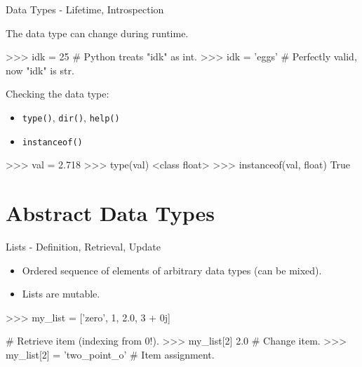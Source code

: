 \documentclass[10pt]{beamer}
\begin{document}
\begin{frame}[fragile]{Data Types - Lifetime, Introspection}
	
	\pause
	The data type can change during runtime.
	
	\pause	
	\begin{pythoncode}
		>>>  idk = 25      # Python treats "idk" as int.
		>>>  idk = 'eggs'  # Perfectly valid, now "idk" is str.
	\end{pythoncode}
	
	\pause
	Checking the data type:
	\begin{itemize}
		\item \pause \small{\texttt{type()}, \texttt{dir()}, \texttt{help()}}
		\item \pause \small{\texttt{instanceof()}}
	\end{itemize}
	
	\pause
	\begin{pythoncode}
		>>> val = 2.718
		>>> type(val)
		<class float>
		>>> instanceof(val, float)
		True
	\end{pythoncode}
\end{frame}


\section{Abstract Data Types}

\begin{frame}[fragile]{Lists - Definition, Retrieval, Update}
	\begin{itemize}
		\item \pause Ordered sequence of elements of arbitrary data types (can be mixed).
		\item \pause Lists are mutable.
	\end{itemize}
	
	\pause
	\begin{pythoncode}
	>>> my_list = ['zero', 1, 2.0, 3 + 0j] 
	\end{pythoncode}

	\begin{pythoncode}
		# Retrieve item (indexing from 0!).
		>>> my_list[2]  
		2.0
		# Change item.
		>>> my_list[2] = 'two_point_o'  # Item assignment. 
	\end{pythoncode}
\end{frame}
\end{document}
